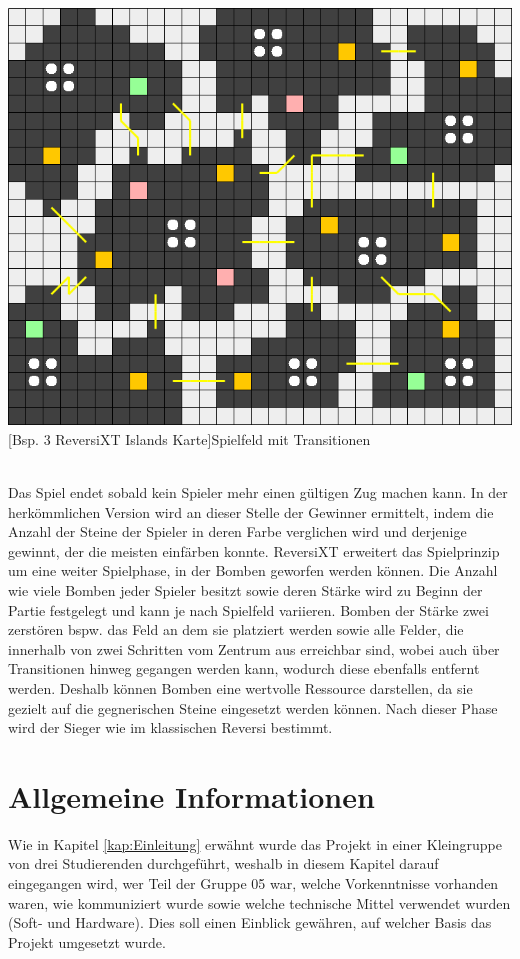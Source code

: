 \documentclass[12pt,a4paper,bibliography=totocnumbered,listof=totocnumbered]{article}
\begin{document}
\vspace{1em}
\begin{minipage}{\linewidth}
	\centering
	\includegraphics[width=0.7\linewidth]{pics/reversixt_islands_map.png}
	[Bsp. 3 ReversiXT Islands Karte]{Spielfeld mit Transitionen}
	\label{fig:reversixt_islands_map}
\end{minipage}
\\


Das Spiel endet sobald kein Spieler mehr einen gültigen Zug machen kann. In der herkömmlichen Version wird an dieser Stelle der Gewinner ermittelt, indem die Anzahl der Steine der Spieler in deren Farbe verglichen wird und derjenige gewinnt, der die meisten einfärben konnte. ReversiXT erweitert das Spielprinzip um eine weiter Spielphase, in der Bomben geworfen werden können. Die Anzahl wie viele Bomben jeder Spieler besitzt sowie deren Stärke wird zu Beginn der Partie festgelegt und kann je nach Spielfeld variieren. Bomben der Stärke zwei zerstören bspw. das Feld an dem sie platziert werden sowie alle Felder, die innerhalb von zwei Schritten vom Zentrum aus erreichbar sind, wobei auch über Transitionen hinweg gegangen werden kann, wodurch diese ebenfalls entfernt werden. Deshalb können Bomben eine wertvolle Ressource darstellen, da sie gezielt auf die gegnerischen Steine eingesetzt werden können. Nach dieser Phase wird der Sieger wie im klassischen Reversi bestimmt.


\newpage
\section{Allgemeine Informationen}
Wie in Kapitel \ref{kap:Einleitung} erwähnt wurde das Projekt in einer Kleingruppe von drei Studierenden durchgeführt, weshalb in diesem Kapitel darauf eingegangen wird, wer Teil der Gruppe 05 war, welche Vorkenntnisse vorhanden waren, wie kommuniziert wurde sowie welche technische Mittel verwendet wurden (Soft- und Hardware). Dies soll einen Einblick gewähren, auf welcher Basis das Projekt umgesetzt wurde.
\end{document}
